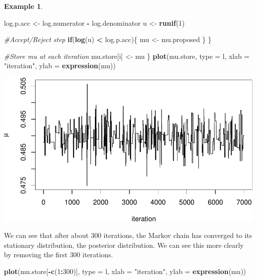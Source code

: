 \documentclass[
]{book}
\newenvironment{Shaded}{\begin{snugshade}}{\end{snugshade}}
\newcommand{\AttributeTok}[1]{\textcolor[rgb]{0.13,0.29,0.53}{#1}}
\newcommand{\CommentTok}[1]{\textcolor[rgb]{0.56,0.35,0.01}{\textit{#1}}}
\newcommand{\ControlFlowTok}[1]{\textcolor[rgb]{0.13,0.29,0.53}{\textbf{#1}}}
\newcommand{\DecValTok}[1]{\textcolor[rgb]{0.00,0.00,0.81}{#1}}
\newcommand{\FunctionTok}[1]{\textcolor[rgb]{0.13,0.29,0.53}{\textbf{#1}}}
\newcommand{\NormalTok}[1]{#1}
\newcommand{\OtherTok}[1]{\textcolor[rgb]{0.56,0.35,0.01}{#1}}
\newcommand{\SpecialCharTok}[1]{\textcolor[rgb]{0.81,0.36,0.00}{\textbf{#1}}}
\newcommand{\StringTok}[1]{\textcolor[rgb]{0.31,0.60,0.02}{#1}}
\theoremstyle{definition}
\theoremstyle{definition}
\newtheorem{example}{Example}[chapter]
\theoremstyle{definition}
\theoremstyle{definition}
\theoremstyle{remark}
\begin{document}
\begin{example}
\begin{Shaded}
\begin{Highlighting}[]
\NormalTok{    log.p.acc }\OtherTok{\textless{}{-}}\NormalTok{ log.numerator }\SpecialCharTok{{-}}\NormalTok{ log.denominator}
\NormalTok{    u }\OtherTok{\textless{}{-}} \FunctionTok{runif}\NormalTok{(}\DecValTok{1}\NormalTok{)}
    
    \CommentTok{\#Accept/Reject step}
    \ControlFlowTok{if}\NormalTok{(}\FunctionTok{log}\NormalTok{(u) }\SpecialCharTok{\textless{}}\NormalTok{ log.p.acc)\{}
\NormalTok{      mu }\OtherTok{\textless{}{-}}\NormalTok{ mu.proposed}
\NormalTok{    \}}
\NormalTok{  \}}
  
  \CommentTok{\#Store mu at each iteration}
\NormalTok{  mu.store[i] }\OtherTok{\textless{}{-}}\NormalTok{ mu}
\NormalTok{\}}
\FunctionTok{plot}\NormalTok{(mu.store, }\AttributeTok{type =} \StringTok{\textquotesingle{}l\textquotesingle{}}\NormalTok{, }\AttributeTok{xlab =} \StringTok{"iteration"}\NormalTok{, }
     \AttributeTok{ylab =} \FunctionTok{expression}\NormalTok{(mu))}
\end{Highlighting}
\end{Shaded}

\includegraphics{_main_files/figure-latex/unnamed-chunk-39-1.pdf}

We can see that after about 300 iterations, the Markov chain has converged to its stationary distribution, the posterior distribution. We can see this more clearly by removing the first 300 iterations.

\begin{Shaded}
\begin{Highlighting}[]
\FunctionTok{plot}\NormalTok{(mu.store[}\SpecialCharTok{{-}}\FunctionTok{c}\NormalTok{(}\DecValTok{1}\SpecialCharTok{:}\DecValTok{300}\NormalTok{)], }\AttributeTok{type =} \StringTok{\textquotesingle{}l\textquotesingle{}}\NormalTok{, }\AttributeTok{xlab =} \StringTok{"iteration"}\NormalTok{, }\AttributeTok{ylab =} \FunctionTok{expression}\NormalTok{(mu))}
\end{Highlighting}
\end{Shaded}


\end{example}
\end{document}
